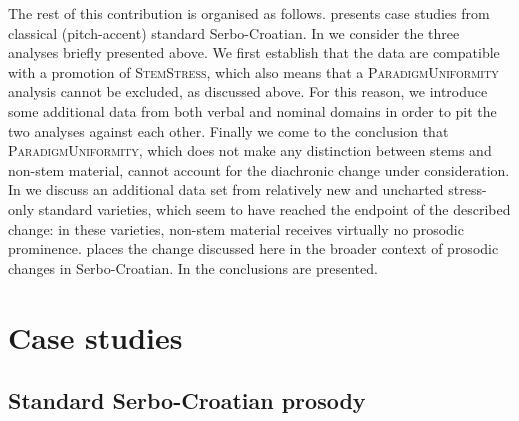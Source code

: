 \documentclass[output=paper,modfonts,nonflat
]{langsci/langscibook}
\begin{document}
The rest of this contribution is organised as follows.  presents case studies from classical (pitch-accent) standard Serbo-Croatian. In   we consider the three analyses briefly presented above. We first establish that the data are compatible with a promotion of \textsc{StemStress}, which also means that a \textsc{ParadigmUniformity} analysis cannot be excluded, as discussed above. For this reason, we introduce some additional data from both verbal and nominal domains in order to pit the two analyses against each other. Finally we come to the conclusion that \textsc{ParadigmUniformity}, which does not make any distinction between stems and non-stem material, cannot account for the diachronic change under consideration. In  we discuss an additional data set from relatively new and uncharted stress-only standard varieties, which seem to have reached the endpoint of the described change: in these varieties, non-stem material receives virtually no prosodic prominence.  places the change discussed here in the broader context of prosodic changes in Serbo-Croatian. In  the conclusions are presented. 

\section{Case studies} \label{sec:kager:2}
\subsection{Standard Serbo-Croatian prosody} \label{sec:kager:subsec21}
\end{document}
